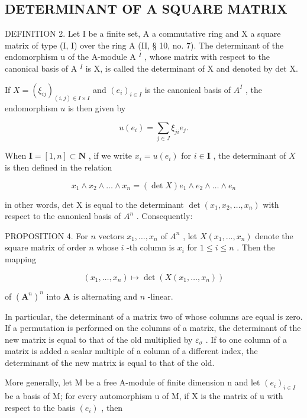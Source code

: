 \subsection{DETERMINANT OF A SQUARE MATRIX}

DEFINITION 2. Let I be a finite set, A a commutative ring and X a square matrix of type (I, I) over the ring A (II, § 10, no. 7). The determinant of the endomorphism u of the A-module A \(^{I}\) , whose matrix with respect to the canonical basis of A \(^{I}\) is X, is called the determinant of X and denoted by det X.

If \(X = (\xi_{ij})_{(i,j) \in I \times I}\) and \((e_i)_{i \in I}\) is the canonical basis of \(A^I\) , the endomorphism \(u\) is then given by

\[
u (e _ {i}) = \sum_ {j \in J} \xi_ {j i} e _ {j}.
\]

When \(\mathbf{I} = [1, n] \subset \mathbf{N}\) , if we write \(x_{i} = u(e_{i})\) for \(i \in \mathbf{I}\) , the determinant of \(X\) is then defined in the relation

\[
x _ {1} \wedge x _ {2} \wedge \dots \wedge x _ {n} = (\det X) e _ {1} \wedge e _ {2} \wedge \dots \wedge e _ {n}\tag{6}
\]

in other words, det X is equal to the determinant \(\det(x_{1}, x_{2}, \ldots, x_{n})\) with respect to the canonical basis of \(A^{n}\) . Consequently:

PROPOSITION 4. For \(n\) vectors \(x_1, \ldots, x_n\) of \(A^n\) , let \(X(x_1, \ldots, x_n)\) denote the square matrix of order \(n\) whose \(i\) -th column is \(x_i\) for \(1 \leqslant i \leqslant n\) . Then the mapping

\[
(x _ {1}, \dots , x _ {n}) \mapsto \det (X (x _ {1}, \dots , x _ {n}))
\]

of \((\mathbf{A}^n)^n\) into \(\mathbf{A}\) is alternating and \(n\) -linear.

In particular, the determinant of a matrix two of whose columns are equal is zero. If a permutation is performed on the columns of a matrix, the determinant of the new matrix is equal to that of the old multiplied by \(\varepsilon_{\sigma}\) . If to one column of a matrix is added a scalar multiple of a column of a different index, the determinant of the new matrix is equal to that of the old.

More generally, let M be a free A-module of finite dimension n and let \((e_{i})_{i\in I}\) be a basis of M; for every automorphism u of M, if X is the matrix of u with respect to the basis \((e_{i})\) , then

